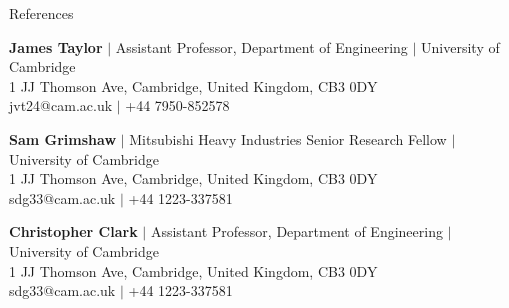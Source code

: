 \documentclass{resume} %
\begin{document}


\begin{rSection}{References}


\textbf{James Taylor} $|$ 
Assistant Professor, Department of Engineering $|$
University of Cambridge\\
1 JJ Thomson Ave, Cambridge, United Kingdom, CB3 0DY\\
jvt24@cam.ac.uk $|$ 
+44 7950-852578

\textbf{Sam Grimshaw} $|$ 
Mitsubishi Heavy Industries Senior Research Fellow $|$
University of Cambridge\\
1 JJ Thomson Ave, Cambridge, United Kingdom, CB3 0DY\\
sdg33@cam.ac.uk $|$ 
+44 1223-337581

\textbf{Christopher Clark} $|$ 
Assistant Professor, Department of Engineering $|$
University of Cambridge\\
1 JJ Thomson Ave, Cambridge, United Kingdom, CB3 0DY\\
sdg33@cam.ac.uk $|$ 
+44 1223-337581







\end{rSection}







\end{document}
